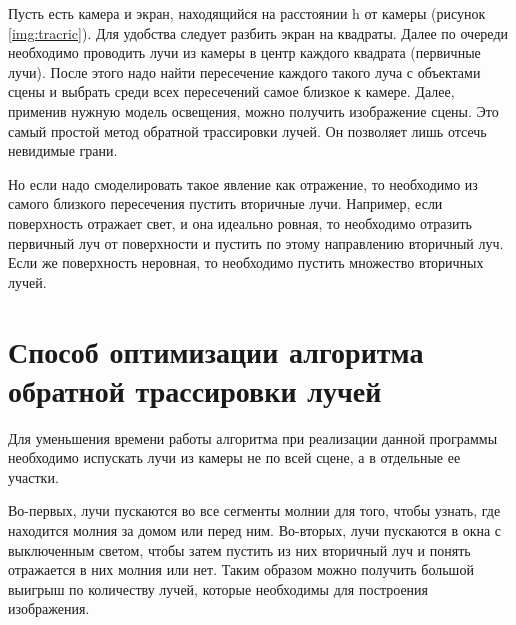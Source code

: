 


 
Пусть есть камера и экран, находящийся на расстоянии h от камеры (рисунок \ref{img:tracric}). Для удобства следует разбить экран на квадраты. Далее по очереди необходимо проводить лучи из камеры в центр каждого квадрата (первичные лучи). После этого надо найти пересечение каждого такого луча с объектами сцены и выбрать среди всех пересечений самое близкое к камере. Далее, применив нужную модель освещения, можно получить изображение сцены. Это самый простой метод обратной трассировки лучей. Он позволяет лишь отсечь невидимые грани.


Но если надо смоделировать такое явление как отражение, то необходимо из самого близкого пересечения пустить вторичные лучи. Например, если поверхность отражает свет, и она идеально ровная, то необходимо отразить первичный луч от поверхности и пустить по этому направлению вторичный луч. Если же поверхность неровная, то необходимо пустить множество вторичных лучей. 

\section{Способ оптимизации алгоритма обратной трассировки лучей}
Для уменьшения времени работы алгоритма при реализации данной программы необходимо испускать лучи из камеры не по всей сцене, а в отдельные ее участки. 

Во-первых, лучи пускаются во все сегменты молнии для того, чтобы узнать, где находится молния за домом или перед ним. Во-вторых, лучи пускаются в окна с выключенным светом, чтобы затем пустить из них вторичный луч и понять отражается в них молния или нет. Таким образом можно получить большой выигрыш по количеству лучей, которые необходимы для построения изображения.

